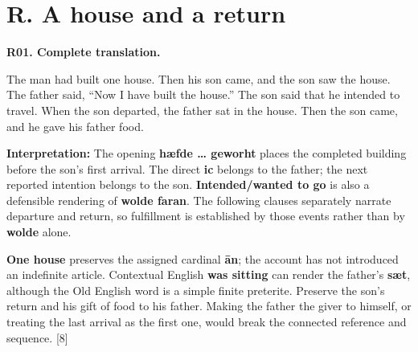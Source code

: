 \section*{R. A house and a return}

\par\begin{minipage}{\linewidth}\raggedright
\textbf{R01. Complete translation.}

The man had built one house. Then his son came, and the son saw the house. The father said, “Now I have built the house.” The son said that he intended to travel. When the son departed, the father sat in the house. Then the son came, and he gave his father food.

\textbf{Interpretation:} The opening \textbf{hæfde … geworht} places the completed building before the son's first arrival. The direct \textbf{ic} belongs to the father; the next reported intention belongs to the son. \textbf{Intended/\allowbreak{}wanted to go} is also a defensible rendering of \textbf{wolde faran}. The following clauses separately narrate departure and return, so fulfillment is established by those events rather than by \textbf{wolde} alone.

\textbf{One house} preserves the assigned cardinal \textbf{ān}; the account has not introduced an indefinite article. Contextual English \textbf{was sitting} can render the father's \textbf{sæt}, although the Old English word is a simple finite preterite. Preserve the son's return and his gift of food to his father. Making the father the giver to himself, or treating the last arrival as the first one, would break the connected reference and sequence. [8]

\end{minipage}\par\addvspace{4pt}

